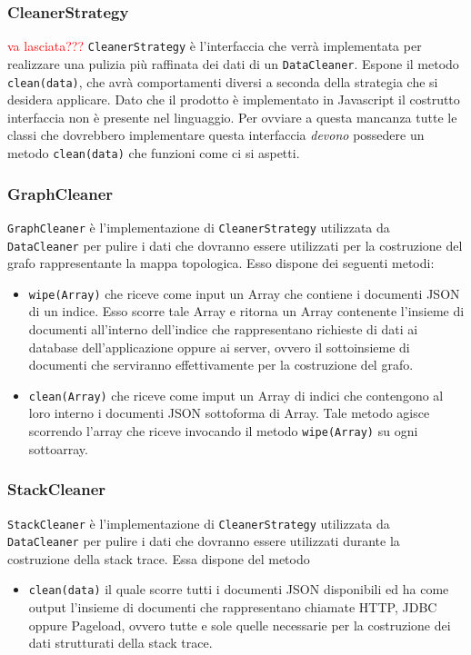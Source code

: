 	
\subsubsection{CleanerStrategy}
\label{sec:CleanerStrategy}
\textcolor{red}{va lasciata???}
\texttt{CleanerStrategy} è l'interfaccia che verrà implementata per realizzare una pulizia più raffinata dei dati di un \texttt{DataCleaner}. Espone il metodo \texttt{clean(data)}, che avrà comportamenti diversi a seconda della strategia che si desidera applicare. Dato che il prodotto è implementato in Javascript il costrutto interfaccia non è presente nel linguaggio. Per ovviare a questa mancanza tutte le classi che dovrebbero implementare questa interfaccia \emph{devono} possedere un metodo \texttt{clean(data)} che funzioni come ci si aspetti. 

	
	
\subsubsection{GraphCleaner}
\label{sec:GraphCleaner}

\texttt{GraphCleaner} è l'implementazione di \texttt{CleanerStrategy} utilizzata da \texttt{DataCleaner} per pulire i dati che dovranno essere utilizzati per la costruzione del grafo rappresentante la mappa topologica. Esso dispone dei seguenti metodi:
\begin{itemize}
	\item \texttt{wipe(Array)} che riceve come input un Array che contiene i documenti JSON di un indice. Esso scorre tale Array e ritorna un Array contenente l'insieme di documenti all'interno dell'indice che rappresentano richieste di dati ai database dell'applicazione oppure ai server, ovvero il sottoinsieme di documenti che serviranno effettivamente per la costruzione del grafo.
	\item \texttt{clean(Array)} che riceve come imput un Array di indici che contengono al loro interno i documenti JSON sottoforma di Array. Tale metodo agisce scorrendo l'array che riceve invocando il metodo \texttt{wipe(Array)} su ogni sottoarray.
\end{itemize}

\subsubsection{StackCleaner}
\label{sec:StackCleaner}

\texttt{StackCleaner} è l'implementazione di \texttt{CleanerStrategy} utilizzata da \texttt{DataCleaner} per pulire i dati che dovranno essere utilizzati durante la costruzione della stack trace. Essa dispone del metodo
\begin{itemize}
	\item \texttt{clean(data)} il quale scorre tutti i documenti JSON disponibili ed ha come output l'insieme di documenti che rappresentano chiamate HTTP, JDBC oppure Pageload, ovvero tutte e sole quelle necessarie per la costruzione dei dati strutturati della stack trace.
\end{itemize}

